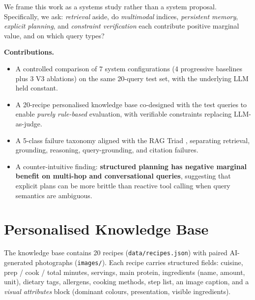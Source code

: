 \documentclass[sigconf, nonacm=true, anonymous=false]{acmart}
\begin{document}
We frame this work as a systems study rather than a system proposal.
Specifically, we ask:
\emph{retrieval} aside, do \emph{multimodal} indices, \emph{persistent
memory}, \emph{explicit planning}, and \emph{constraint verification}
each contribute positive marginal value, and on which query types?

\smallskip\noindent\textbf{Contributions.}
\begin{itemize}\setlength\itemsep{1pt}
  \item A controlled comparison of 7 system configurations (4 progressive
        baselines plus 3 V3 ablations) on the same 20-query test set,
        with the underlying LLM held constant.
  \item A 20-recipe personalised knowledge base co-designed with the test
        queries to enable \emph{purely rule-based} evaluation, with
        verifiable constraints replacing LLM-as-judge.
  \item A 5-class failure taxonomy aligned with the RAG Triad
        \cite{rag-triad}, separating retrieval, grounding, reasoning,
        query-grounding, and citation failures.
  \item A counter-intuitive finding: \textbf{structured planning has
        negative marginal benefit on multi-hop and conversational
        queries}, suggesting that explicit plans can be more brittle than
        reactive tool calling when query semantics are ambiguous.
\end{itemize}

\section{Personalised Knowledge Base}
\label{sec:kb}

The knowledge base contains 20 recipes (\texttt{data/recipes.json}) with
paired AI-generated photographs (\texttt{images/}). Each recipe carries
structured fields: cuisine, prep / cook / total minutes, servings, main
protein, ingredients (name, amount, unit), dietary tags, allergens,
cooking methods, step list, an image caption, and a
\emph{visual attributes} block (dominant colours, presentation,
visible ingredients).
\end{document}
